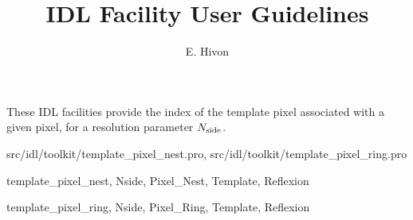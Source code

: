 
\sloppy


\title{\healpix IDL Facility User Guidelines}
 \section[template\_pixel\_xxxx]{ }
\label{idl:template_pixel_xxx}
\author{E. Hivon}

\begin{facility}
{These IDL facilities provide the index of the template pixel associated with a given
  \healpix pixel, for a resolution parameter ${N_{\rm side}}$. 

}
{src/idl/toolkit/template\_pixel\_nest.pro, src/idl/toolkit/template\_pixel\_ring.pro}
\end{facility}

\begin{IDLformat}
{template\_pixel\_nest, Nside, Pixel\_Nest, Template, Reflexion}
\end{IDLformat}
\begin{IDLformat}
{template\_pixel\_ring, Nside, Pixel\_Ring, Template, Reflexion}
\end{IDLformat}



